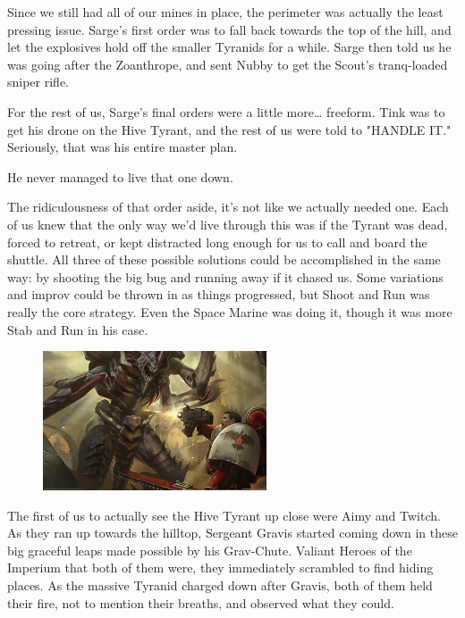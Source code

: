Since we still had all of our mines in place, the perimeter was actually the least pressing issue. 
Sarge's first order was to fall back towards the top of the hill, and let the explosives hold off the smaller Tyranids for a while. 
Sarge then told us he was going after the Zoanthrope, and sent Nubby to get the Scout's tranq-loaded sniper rifle. 


For the rest of us, Sarge's final orders were a little more… freeform. 
Tink was to get his drone on the Hive Tyrant, and the rest of us were told to "HANDLE IT." Seriously, that was his entire master plan. 





He never managed to live that one down. 


The ridiculousness of that order aside, it's not like we actually needed one. 
Each of us knew that the only way we'd live through this was if the Tyrant was dead, forced to retreat, or kept distracted long enough for us to call and board the shuttle. 
All three of these possible solutions could be accomplished in the same way: 
by shooting the big bug and running away if it chased us. 
Some variations and improv could be thrown in as things progressed, but Shoot and Run was really the core strategy. 
Even the Space Marine was doing it, though it was more Stab and Run in his case.

\begin{figure}
	\begin{center}
		\includegraphics[width=\figwidth]{pics/12/48.png}
	\end{center}
\end{figure}
The first of us to actually see the Hive Tyrant up close were Aimy and Twitch. 
As they ran up towards the hilltop, Sergeant Gravis started coming down in these big graceful leaps made possible by his Grav-Chute. 
Valiant Heroes of the Imperium that both of them were, they immediately scrambled to find hiding places. 
As the massive Tyranid charged down after Gravis, both of them held their fire, not to mention their breaths, and observed what they could. 


